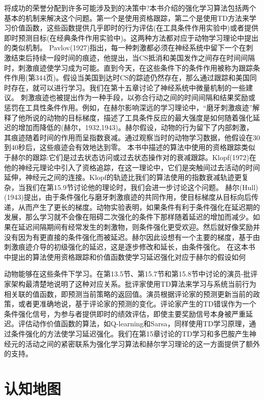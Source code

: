 将成功的荣誉分配到许多可能涉及到的决策中?本书介绍的强化学习算法包括两个基本的机制来解决这个问题。第一个是使用资格跟踪，第二个是使用TD方法来学习价值函数，这些函数提供几乎即时的行为评估(在工具条件作用实验中)或者提供即时预测目标(在经典条件作用实验中)。这两种方法都对应于动物学习理论中提出的类似机制。
Pavlov(1927)指出，每一种刺激都必须在神经系统中留下一个在刺激结束后持续一段时间的痕迹，他提出，当CS抵消和美国发作之间存在时间间隔时，刺激痕迹使学习成为可能。直到今天，在这些条件下的条件作用被称为跟踪条件作用(第344页)。假设当美国到达时CS的踪迹仍然存在，那么通过跟踪和美国同时存在，就可以进行学习。我们在第十五章讨论了神经系统中微量机制的一些建议。
刺激痕迹也被提出作为一种手段，以弥合行动之间的时间间隔和结果奖励或惩罚在工具性条件作用。例如，在赫尔影响深远的学习理论中，“磨牙刺激痕迹”解释了他所说的动物的目标梯度，描述了工具条件反应的最大强度是如何随着强化延迟的增加而降低的(赫尔，1932,1943)。赫尔假设，动物的行为留下了内部刺激，其痕迹随着时间的作用而呈指数衰减。通过观察当时的动物学习数据，他假设在30到40秒后，这些痕迹会有效地达到零。
本书中描述的算法中使用的资格跟踪类似于赫尔的跟踪:它们是过去状态访问或过去状态操作对的衰减跟踪。Klopf(1972)在他的神经元理论中引入了资格追踪，在这一理论中，它们是突触间过去活动的时间延伸，神经元之间的连接。Klopf的轨迹比我们的算法使用的指数衰减轨迹更复杂，当我们在第15.9节讨论他的理论时，我们会进一步讨论这个问题。
赫尔(Hull)(1943)提出，由于条件强化与磨牙刺激痕迹的共同作用，使目标梯度从目标向后传递，从而产生了更长的梯度。动物实验表明，如果条件有利于条件强化在延迟期的发展，那么学习就不会像在阻碍二次强化的条件下那样随着延迟的增加而减少。如果在延迟间隔期间有经常发生的刺激物，则条件强化更受欢迎。然后就好像奖励并没有因为有更直接的条件强化而被延迟。赫尔因此设想有一个主要的梯度，基于由刺激痕迹介导的初级强化的延迟，这是逐步修改和延长，由条件强化。
在这本书中提出的算法使用资格跟踪和价值函数使学习延迟强化对应于赫尔的假设如何

动物能够在这些条件下学习。在第13.5节、第15.7节和第15.8节中讨论的演员-批评家架构最清楚地说明了这种对应关系。批评家使用TD算法来学习与系统当前行为相关联的值函数，即预测当前策略的返回值。演员根据评论家的预测更新当前的政策，或者更准确地说，基于评论家的预测的变化。评论家产生的TD错误作为一个条件强化信号，为参与者提供即时的绩效评估，即使主要奖励信号本身被严重延迟。评估动作价值函数的算法，如Q-learning和Sarsa，同样使用TD学习原理，通过条件强化的方法使学习延迟强化。我们在第15章讨论的TD学习和多巴胺产生神经元的活动之间的紧密联系为强化学习算法和赫尔学习理论的这一方面提供了额外的支持。


\section{认知地图}

